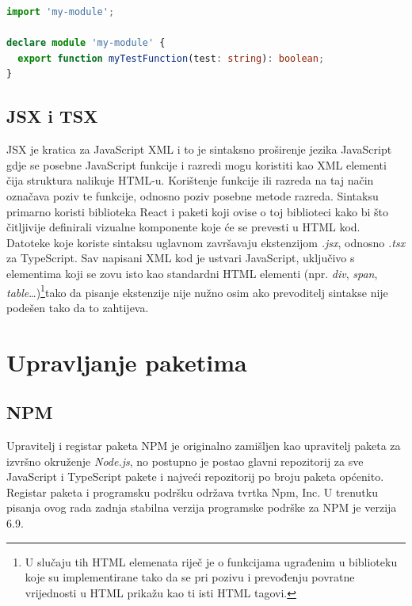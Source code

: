 \documentclass[times, utf8, diplomski, numeric]{fer}
\newcommand{\razmakp}{\vspace{18pt}}
\newcommand{\razmaks}{\vspace{10pt}}
\begin{document}
\razmakp %
\begin{lstlisting}[language=TypeScript, caption={Primjer deklaracijske datoteke}, label={lst:declaration_file}]
import 'my-module';

declare module 'my-module' {
  export function myTestFunction(test: string): boolean;
}
\end{lstlisting}
\razmaks


\subsection{JSX i TSX}

JSX je kratica za JavaScript XML i to je sintaksno proširenje jezika JavaScript gdje se posebne JavaScript funkcije i razredi mogu koristiti kao XML elementi čija struktura nalikuje HTML-u\citep{jsx_spec}.
Korištenje funkcije ili razreda na taj način označava poziv te funkcije, odnosno poziv posebne metode razreda. Sintaksu primarno koristi biblioteka React i paketi koji ovise o toj biblioteci kako bi što čitljivije definirali vizualne komponente koje će se prevesti u HTML kod\citep{react_docs}.
Datoteke koje koriste sintaksu uglavnom završavaju ekstenzijom \emph{.jsx}, odnosno \emph{.tsx} za TypeScript\citep{ts_hand}.
Sav napisani XML kod je ustvari JavaScript, uključivo s elementima koji se zovu isto kao standardni HTML elementi (npr. \emph{div}, \emph{span}, \emph{table}…)\footnote{
    U slučaju tih HTML elemenata riječ je o funkcijama ugrađenim u biblioteku koje su implementirane tako da se pri pozivu i prevođenju povratne vrijednosti u HTML prikažu kao ti isti HTML tagovi.
}tako da pisanje ekstenzije nije nužno osim ako prevoditelj sintakse nije podešen tako da to zahtijeva.


\newpage
\section{Upravljanje paketima}

\razmaks
\subsection{NPM}

Upravitelj i registar paketa NPM je originalno zamišljen kao upravitelj paketa za izvršno okruženje \emph{Node.js}, no postupno je postao glavni repozitorij za sve JavaScript i TypeScript pakete i najveći repozitorij po broju paketa općenito\citep{med_npm_stats}.
Registar paketa i programsku podršku održava tvrtka Npm, Inc.
U trenutku pisanja ovog rada zadnja stabilna verzija programske podrške za NPM je verzija 6.9\citep{wiki_npm}.
\end{document}
